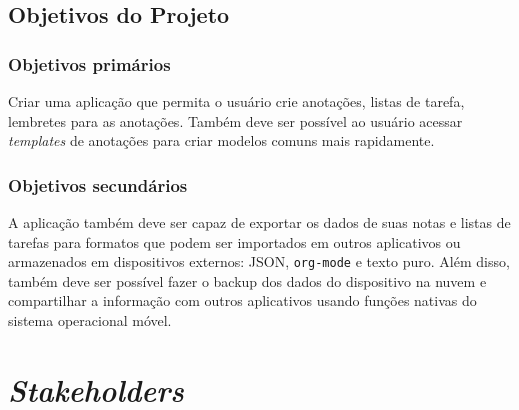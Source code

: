 \documentclass[
	12pt,				%
	oneside,			%
	a4paper,			%
	english,			%
	brazil,				%
	]{abntex2}
\begin{document}
\section{Objetivos do Projeto}
\subsection{Objetivos primários}
Criar uma aplicação que permita o usuário crie anotações, listas de tarefa, lembretes para as anotações. Também deve ser possível ao usuário acessar \textit{templates} de anotações para criar modelos comuns mais rapidamente.

\subsection{Objetivos secundários}
A aplicação também deve ser capaz de exportar os dados de suas notas e listas de tarefas para formatos que podem ser importados em outros aplicativos ou armazenados em dispositivos externos: JSON, \texttt{org-mode} e texto puro. Além disso, também deve ser possível fazer o backup dos dados do dispositivo na nuvem e compartilhar a informação com outros aplicativos usando funções nativas do sistema operacional móvel.

\chapter{\foreignlanguage{english}{\textit{Stakeholders}}}
\end{document}
